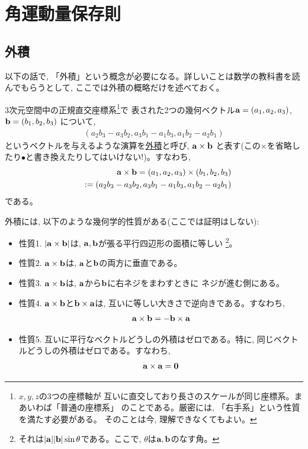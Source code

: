 \chapter{角運動量保存則}

\section{外積}

以下の話で, 「外積」という概念が必要になる。詳しいことは数学の教科書を読んでもらうとして, 
ここでは外積の概略だけを述べておく。

3次元空間中の正規直交座標系\footnote{$x, y, z$の3つの座標軸が
互いに直交しており長さのスケールが同じ座標系。まあいわば「普通の座標系」
のことである。厳密には, 「右手系」という性質を満たす必要がある。
そのことは今, 理解できなくてもよい。}で
表された2つの幾何ベクトル${\bf a}=(a_1, a_2, a_3)$, ${\bf b}=(b_1, b_2, b_3)$
について, 
\begin{eqnarray}
(a_2b_3-a_3b_2, a_3b_1-a_1b_3, a_1b_2-a_2b_1)
\end{eqnarray}
というベクトルを与えるような演算を\underline{外積}と呼び, ${\bf a}\times{\bf b}$
と表す(この$\times$を省略したり$\bullet$と書き換えたりしてはいけない!)。すなわち, 
\begin{eqnarray}
&&{\bf a}\times{\bf b}=(a_1, a_2, a_3)\times(b_1, b_2, b_3)\nonumber\\
&&:=(a_2b_3-a_3b_2, a_3b_1-a_1b_3, a_1b_2-a_2b_1)
\label{eq:vectprod}\end{eqnarray}
である。

外積には, 以下のような幾何学的性質がある(ここでは証明はしない): 
\begin{itemize}
\item 性質1. $|{\bf a}\times{\bf b}|$は, ${\bf a}, {\bf b}$が張る平行四辺形の面積に等しい
\footnote{それは$|{\bf a}||{\bf b}|\sin\theta$である。ここで, $\theta$は${\bf a}, {\bf b}$のなす角。}。
\item 性質2. ${\bf a}\times{\bf b}$は, ${\bf a}$と${\bf b}$の両方に垂直である。
\item 性質3. ${\bf a}\times{\bf b}$は, ${\bf a}$から${\bf b}$に右ネジをまわすときに
ネジが進む側にある。
\item 性質4. ${\bf a}\times{\bf b}$と${\bf b}\times{\bf a}$は, 互いに等しい大きさで逆向きである。すなわち, 
\begin{eqnarray}{\bf a}\times{\bf b}=-{\bf b}\times{\bf a}\end{eqnarray}
\item 性質5. 互いに平行なベクトルどうしの外積はゼロである。特に, 同じベクトルどうしの外積はゼロである。すなわち, 
\begin{eqnarray}{\bf a}\times{\bf a}={\bf 0}\end{eqnarray}
\end{itemize}

